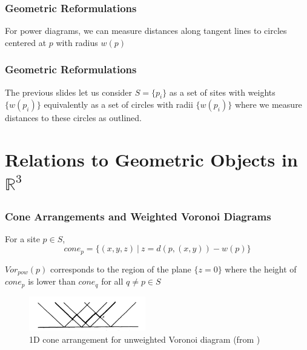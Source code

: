 \documentclass{beamer}
\newcommand{\R}{\mathbb{R}}
\begin{document}
\begin{frame}
  \frametitle{Geometric Reformulations}

  \begin{figure}
  \end{figure}

  For power diagrams, we can measure distances along tangent lines to circles centered at $p$ with radius $w(p)$

\end{frame}

\begin{frame}
  \frametitle{Geometric Reformulations}

  The previous slides let us consider $S = \{ p_i \}$ as a set of sites with weights $\{ w(p_i) \}$ equivalently as a set of circles with radii $\{
  w(p_i) \}$ where we measure distances to these circles as outlined.

\end{frame}

\section{Relations to Geometric Objects in $\R^3$}
\begin{frame}
  \frametitle{Cone Arrangements and Weighted Voronoi Diagrams}

  For a site $p \in S$,
  \[ cone_p = \{ (x,y,z) \ | \ z = d(p, (x,y)) - w(p) \} \]

  \vspace{1cm}

  $Vor_{pow}(p)$ corresponds to the region of the plane $\{ z = 0 \}$ where the height of $cone_p$ is lower than $cone_q$ for all $q \neq p \in S$
  \cite{rosenberger_additive}

  \begin{figure}
    \includegraphics[width=2in]{cone.png}
    \caption{1D cone arrangement for unweighted Voronoi diagram (from \cite{rosenberger_additive})}
  \end{figure}

\end{frame}
\end{document}
